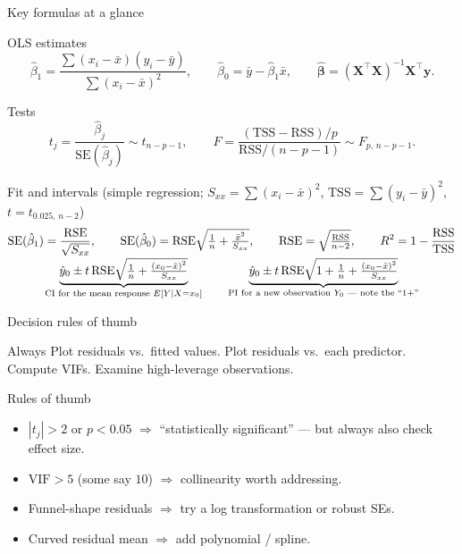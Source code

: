 \documentclass[aspectratio=169,11pt]{beamer}
\begin{document}
\begin{frame}{Key formulas at a glance}
  \small
  \begin{block}{OLS estimates}
    \[
      \hat\beta_1 = \frac{\sum (x_i - \bar x)(y_i - \bar y)}
                         {\sum (x_i - \bar x)^2},
      \qquad
      \hat\beta_0 = \bar y - \hat\beta_1 \bar x,
      \qquad
      \hat{\boldsymbol\beta} = (\mathbf{X}^\top\mathbf{X})^{-1}\mathbf{X}^\top\mathbf{y}.
    \]
  \end{block}
  \begin{block}{Tests}
    \[
      t_j = \frac{\hat\beta_j}{\mathrm{SE}(\hat\beta_j)} \sim t_{n-p-1},
      \qquad
      F = \frac{(\mathrm{TSS} - \mathrm{RSS})/p}
              {\mathrm{RSS}/(n - p - 1)} \sim F_{p,\,n-p-1}.
    \]
  \end{block}
  \begin{block}{Fit and intervals \normalfont\scriptsize
      (simple regression; $S_{xx}=\sum(x_i-\bar x)^2$,
       $\mathrm{TSS}=\sum(y_i-\bar y)^2$, $t=t_{0.025,\,n-2}$)}
    \vspace{-2.6ex}
    \begin{gather*}
      \mathrm{SE}(\hat\beta_1)=\frac{\mathrm{RSE}}{\sqrt{S_{xx}}},
      \qquad
      \mathrm{SE}(\hat\beta_0)=\mathrm{RSE}\sqrt{\tfrac1n+\tfrac{\bar x^2}{S_{xx}}},
      \qquad
      \mathrm{RSE}=\sqrt{\tfrac{\mathrm{RSS}}{n-2}},
      \qquad
      R^2 = 1 - \frac{\mathrm{RSS}}{\mathrm{TSS}} \\[-2pt]
      \underbrace{\hat y_0\pm t\,\mathrm{RSE}
        \sqrt{\tfrac1n+\tfrac{(x_0-\bar x)^2}{S_{xx}}}}
        _{\text{CI for the mean response } E[Y\mid X=x_0]}
      \qquad
      \underbrace{\hat y_0\pm t\,\mathrm{RSE}
        \sqrt{1+\tfrac1n+\tfrac{(x_0-\bar x)^2}{S_{xx}}}}
        _{\text{PI for a new observation } Y_0 \text{ --- note the } ``1+{}"}
    \end{gather*}
  \end{block}
\end{frame}

\begin{frame}{Decision rules of thumb}
  \begin{block}{Always}
    Plot residuals vs.\ fitted values. Plot residuals vs.\ each
    predictor. Compute VIFs. Examine high-leverage observations.
  \end{block}
  \begin{block}{Rules of thumb}
    \begin{itemize}
      \item $|t_j| > 2$ or $p < 0.05$ $\Rightarrow$ ``statistically
            significant'' --- but always also check effect size.
      \item $\mathrm{VIF} > 5$ (some say $10$) $\Rightarrow$ collinearity
            worth addressing.
      \item Funnel-shape residuals $\Rightarrow$ try a log transformation
            or robust SEs.
      \item Curved residual mean $\Rightarrow$ add polynomial / spline.
    \end{itemize}
  \end{block}
\end{frame}
\end{document}

